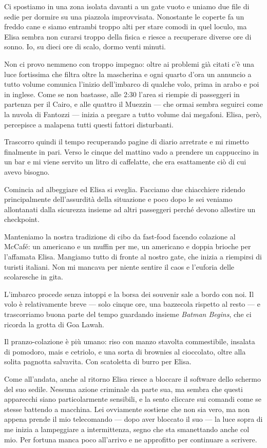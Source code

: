 Ci spostiamo in una zona isolata davanti a un gate vuoto e uniamo due file di sedie per dormire su una piazzola improvvisata. Nonostante le coperte fa un freddo cane e siamo entrambi troppo alti per stare comodi in quel loculo, ma Elisa sembra non curarsi troppo della fisica e riesce a recuperare diverse ore di sonno. Io, su dieci ore di scalo, dormo venti minuti.

Non ci provo nemmeno con troppo impegno: oltre ai problemi già citati c'è una luce fortissima che filtra oltre la mascherina e ogni quarto d'ora un annuncio a tutto volume comunica l'inizio dell'imbarco di qualche volo, prima in arabo e poi in inglese. Come se non bastasse, alle 2:30 l'area si riempie di passeggeri in partenza per il Cairo, e alle quattro il Muezzin — che ormai sembra seguirci come la nuvola di Fantozzi — inizia a pregare a tutto volume dai megafoni. Elisa, però, percepisce a malapena tutti questi fattori disturbanti.

Trascorro quindi il tempo recuperando pagine di diario arretrate e mi rimetto finalmente in pari. Verso le cinque del mattino vado a prendere un cappuccino in un bar e mi viene servito un litro di caffelatte, che era esattamente ciò di cui avevo bisogno.

Comincia ad albeggiare ed Elisa si sveglia. Facciamo due chiacchiere ridendo principalmente dell'assurdità della situazione e poco dopo le sei veniamo allontanati dalla sicurezza insieme ad altri passeggeri perché devono allestire un checkpoint.

Manteniamo la nostra tradizione di cibo da fast-food facendo colazione al McCafé: un americano e un muffin per me, un americano e doppia brioche per l'affamata Elisa. Mangiamo tutto di fronte al nostro gate, che inizia a riempirsi di turisti italiani. Non mi mancava per niente sentire il caos e l'euforia delle scolaresche in gita.

L'imbarco procede senza intoppi e la borsa dei souvenir sale a bordo con noi. Il volo è relativamente breve — solo cinque ore, una bazzecola rispetto al resto — e trascorriamo buona parte del tempo guardando insieme \textit{Batman Begins}, che ci ricorda la grotta di Goa Lawah.

Il pranzo-colazione è più umano: riso con manzo stavolta commestibile, insalata di pomodoro, mais e cetriolo, e una sorta di brownies al cioccolato, oltre alla solita pagnotta salvavita. Con scatoletta di burro per Elisa.

Come all'andata, anche al ritorno Elisa riesce a bloccare il software dello schermo del suo sedile. Nessuna azione criminale da parte sua, ma sembra che questi apparecchi siano particolarmente sensibili, e la sento cliccare sui comandi come se stesse battendo a macchina. Lei ovviamente sostiene che non sia vero, ma non appena prende il mio telecomando — dopo aver bloccato il suo — la luce sopra di me inizia a lampeggiare a intermittenza, segno che sta smanettando anche col mio. Per fortuna manca poco all'arrivo e ne approfitto per continuare a scrivere.

